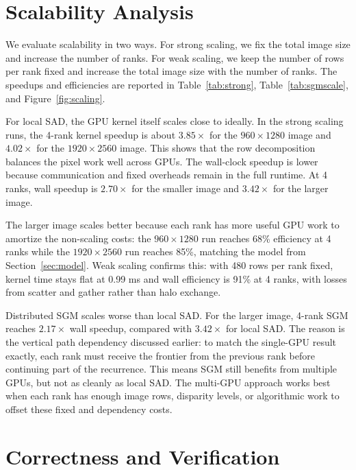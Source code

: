 \documentclass[11pt]{article}
\begin{document}
\section{Scalability Analysis}
\label{sec:scaling}

We evaluate scalability in two ways. For strong scaling, we fix the total image
size and increase the number of ranks. For weak scaling, we keep the number of
rows per rank fixed and increase the total image size with the number of ranks.
The speedups and efficiencies are reported in Table~\ref{tab:strong},
Table~\ref{tab:sgmscale}, and Figure~\ref{fig:scaling}.

For local SAD, the GPU kernel itself scales close to ideally. In the strong
scaling runs, the 4-rank kernel speedup is about $3.85\times$ for the
$960\times1280$ image and $4.02\times$ for the $1920\times2560$ image. This
shows that the row decomposition balances the pixel work well across GPUs. The
wall-clock speedup is lower because communication and fixed overheads remain in
the full runtime. At 4 ranks, wall speedup is $2.70\times$ for the smaller image
and $3.42\times$ for the larger image.

The larger image scales better because each rank has more useful GPU work to
amortize the non-scaling costs: the $960\times1280$ run reaches 68\% efficiency
at 4 ranks while the $1920\times2560$ run reaches 85\%, matching the model from
Section~\ref{sec:model}. Weak scaling confirms this: with 480 rows per rank
fixed, kernel time stays flat at 0.99 ms and wall efficiency is 91\% at 4 ranks,
with losses from scatter and gather rather than halo exchange.

Distributed SGM scales worse than local SAD. For the larger image, 4-rank SGM
reaches $2.17\times$ wall speedup, compared with $3.42\times$ for local SAD. The
reason is the vertical path dependency discussed earlier: to match the
single-GPU result exactly, each rank must receive the frontier from the previous
rank before continuing part of the recurrence. This means SGM still benefits
from multiple GPUs, but not as cleanly as local SAD. The multi-GPU approach works
best when each rank has enough image rows, disparity levels, or algorithmic work
to offset these fixed and dependency costs.


\section{Correctness and Verification}
\label{sec:correct}
\end{document}
